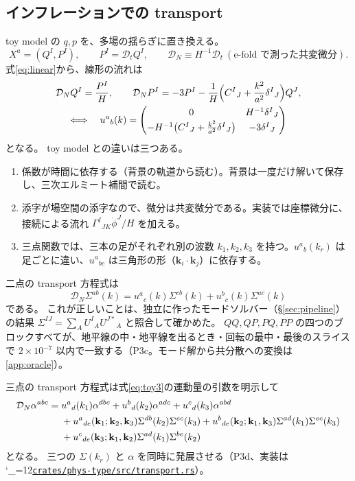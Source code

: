 \documentclass[a4paper,11pt]{ltjsarticle}
\newcommand{\Dt}{\mathcal{D}_t}
\newcommand{\DN}{\mathcal{D}_N}
\newcommand{\repourl}{https://github.com/inuverse44/phys-type}
\newcommand{\reporev}{b1fea87}
\newcommand{\repo}{\begingroup\catcode`\_=12\relax\repoaux}
\newcommand{\repoaux}[1]{\href{\repourl/blob/\reporev/#1}{\nolinkurl{#1}}\endgroup}
\begin{document}
\subsection{インフレーションでの transport}

toy model の $q,p$ を、多場の揺らぎに置き換える。
\[
X^a=(Q^I,P^I),\qquad P^I=\Dt Q^I,\qquad \DN\equiv H^{-1}\Dt\ (\text{e-fold で測った共変微分}).
\]
式\eqref{eq:linear}から、線形の流れは
\begin{gather}
\DN Q^I=\frac{P^I}{H},\qquad \DN P^I=-3P^I-\frac{1}{H}\Big(C^I{}_J+\frac{k^2}{a^2}\delta^I{}_J\Big)Q^J,
\notag\\
\Longleftrightarrow\quad
u^a{}_b(k)=\begin{pmatrix}0&H^{-1}\delta^I{}_J\\[2pt]-H^{-1}\big(C^I{}_J+\frac{k^2}{a^2}\delta^I{}_J\big)&-3\delta^I{}_J\end{pmatrix}
\label{eq:u}
\end{gather}
となる。
toy model との違いは三つある。
\begin{enumerate}
\item 係数が時間に依存する（背景の軌道から読む）。背景は一度だけ解いて保存し、三次エルミート補間で読む。
\item 添字が場空間の添字なので、微分は共変微分である。実装では座標微分に、接続による流れ $\Gamma^I{}_{JK}\dot\phi^J/H$ を加える。
\item 三点関数では、三本の足がそれぞれ別の波数 $k_1,k_2,k_3$ を持つ。$u^a{}_b(k_r)$ は足ごとに違い、$u^a{}_{bc}$ は三角形の形（$\mathbf k_i\cdot\mathbf k_j$）に依存する。
\end{enumerate}

二点の transport 方程式は
\[
\DN\Sigma^{ab}(k)=u^a{}_c(k)\Sigma^{cb}(k)+u^b{}_c(k)\Sigma^{ac}(k)
\]
である。
これが正しいことは、独立に作ったモードソルバー（\S\ref{sec:pipeline}）の結果 $\Sigma^{IJ}=\sum_AU^I{}_AU^{J*}{}_A$ と照合して確かめた。
$QQ,QP,PQ,PP$ の四つのブロックすべてが、地平線の中・地平線を出るとき・回転の最中・最後のスライスで $2\times10^{-7}$ 以内で一致する（P3c。モード解から共分散への変換は\ref{app:oracle}）。

三点の transport 方程式は式\eqref{eq:toy3}の運動量の引数を明示して
\begin{align}
\DN\alpha^{abc}={}&u^a{}_d(k_1)\alpha^{dbc}+u^b{}_d(k_2)\alpha^{adc}+u^c{}_d(k_3)\alpha^{abd}\notag\\
&+u^a{}_{de}(\mathbf k_1;\mathbf k_2,\mathbf k_3)\Sigma^{db}(k_2)\Sigma^{ec}(k_3)
+u^b{}_{de}(\mathbf k_2;\mathbf k_1,\mathbf k_3)\Sigma^{ad}(k_1)\Sigma^{ec}(k_3)\notag\\
&+u^c{}_{de}(\mathbf k_3;\mathbf k_1,\mathbf k_2)\Sigma^{ad}(k_1)\Sigma^{be}(k_2)
\end{align}
となる。
三つの $\Sigma(k_r)$ と $\alpha$ を同時に発展させる（P3d、実装は \repo{crates/phys-type/src/transport.rs}）。
\end{document}
